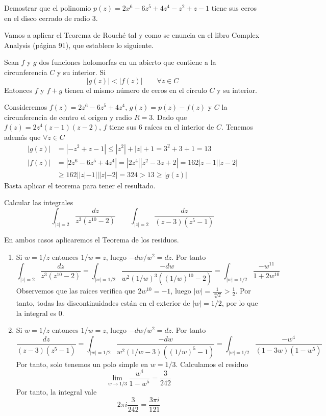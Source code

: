 \documentclass[twoside]{article}
\begin{document}
\begin{ejercicio}{5}
Demostrar que el polinomio $p(z)=2x^6-6z^5+4z^4-z^2+z-1$ tiene sus ceros en el disco cerrado de radio $3$.
\begin{solucion}
Vamos a aplicar el Teorema de Rouché tal y como se enuncia en el libro Complex Analysis (página 91), que establece lo siguiente.
\begin{theorem}
Sean $f$ y $g$ dos funciones holomorfas en un abierto que contiene a la circunferencia $C$ y su interior. Si 
$$|g(z)|<|f(z)| \qquad \forall z \in C
$$
Entonces $f$ y $f+g$ tienen el mismo número de ceros en el  círculo $C$ y su interior. 
\end{theorem}
Consideremos $f(z)=2z^6-6z^5+4z^4$, $g(z)=p(z)-f(z)$ y $C$ la circunferencia de centro el origen y radio $R=3$. Dado que $f(z)=2z^4(z-1)(z-2)$, $f$ tiene sus 6 raíces en el interior de $C$. Tenemos además que $\forall z \in C$ 
\begin{align*}
|g(z)|&=|-z^2+z-1|\leq |z^2|+|z|+1 = 3^2+3+1=13\\
|f(z)|&=|2z^6-6z^5+4z^4|=|2z^4||z^2-3z+2|=162|z-1||z-2|\\
&\geq 162||z|-1|||z|-2| = 324 > 13 \geq |g(z)|
\end{align*}
Basta aplicar el teorema para tener el resultado.
\end{solucion}
\end{ejercicio}
\begin{ejercicio}{6}
Calcular las integrales
$$
\int_{|z|=2}\frac{dz}{z^3(z^{10}-2)} \qquad \int_{|z|=2}\frac{dz}{(z-3)(z^5-1)}
$$
\end{ejercicio}
\begin{solucion}
En ambos casos aplicaremos el Teorema de los residuos.
\begin{enumerate}
\item Si $w = 1/z$ entonces $1/w = z$, luego $-dw/w^2 = dz$. Por tanto 
$$
\int_{|z|=2}\frac{dz}{z^3(z^{10}-2)}= \int_{|w|=1/2} \frac{-dw}{w^2 (1/w)^3((1/w)^{10}-2)} = \int_{|w|=1/2}\frac{-w^{11}}{1+2w^{10}}
$$
Observemos que las raíces verifica que $2w^10 = -1$, luego $|w| = \frac{1}{\sqrt[10]{2}} > \frac{1}{2}$. Por tanto, todas las discontinuidades están en el exterior de $|w|=1/2$, por lo que la integral es $0$.
\item Si $w = 1/z$ entonces $1/w = z$, luego $-dw/w^2 = dz$. Por tanto 
$$
\frac{dz}{(z-3)(z^5-1)}= \int_{|w|=1/2} \frac{-dw}{w^2 (1/w-3)((1/w)^{5}-1)} = \int_{|w|=1/2}\frac{-w^{4}}{(1-3w)(1-w^5)}
$$
Por tanto, solo tenemos un polo simple en $w=1/3$. Calculamos el residuo
$$
\lim_{w\to 1/3} \frac{w^4}{1-w^5} = \frac{3}{242}
$$
Por tanto, la integral vale
$$2\pi i \frac{3}{242} = \frac{3\pi i}{121}$$
\end{enumerate}
\end{solucion}
\newpage
\end{document}
